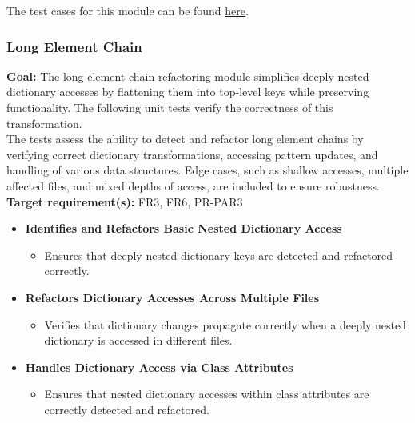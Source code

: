 \documentclass[12pt, titlepage]{article}
\begin{document}
\begin{enumerate}[label={\bf \textcolor{Maroon}{test-SRT-\arabic*}}, wide=0pt, font=\itshape]
\noindent The test cases for this module can be found \href{https://github.com/ssm-lab/capstone--source-code-optimizer/blob/new-poc/tests/refactorers/test_str_concat_in_loop_refactor.py}{here}.

\subsubsection{Long Element Chain}

\textbf{Goal:} The long element chain refactoring module simplifies deeply nested dictionary accesses by flattening them into top-level keys while preserving functionality. The following unit tests verify the correctness of this transformation.\\

\noindent The tests assess the ability to detect and refactor long element chains by verifying correct dictionary transformations, accessing pattern updates, and handling of various data structures. Edge cases, such as shallow accesses, multiple affected files, and mixed depths of access, are included to ensure robustness. \\

\noindent\textbf{Target requirement(s):} FR3, FR6, PR-PAR3~\cite{SRS} \\

\begin{itemize}
    \item \textbf{Identifies and Refactors Basic Nested Dictionary Access}
    \begin{itemize}
        \item Ensures that deeply nested dictionary keys are detected and refactored correctly.
    \end{itemize}

    \item \textbf{Refactors Dictionary Accesses Across Multiple Files}
    \begin{itemize}
        \item Verifies that dictionary changes propagate correctly when a deeply nested dictionary is accessed in different files.
    \end{itemize}

    \item \textbf{Handles Dictionary Access via Class Attributes}
    \begin{itemize}
        \item Ensures that nested dictionary accesses within class attributes are correctly detected and refactored.
    \end{itemize}


\end{itemize}
\end{enumerate}
\end{document}
